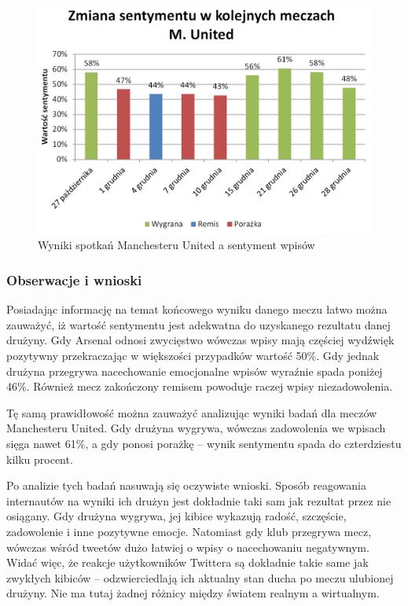 \begin{figure}[ht!]
\centering
\includegraphics[width=120mm]{img/pozytywnosc-munited2.png}
\caption{Wyniki spotkań Manchesteru United a sentyment wpisów}
\label{image:pozytywnosc-munited}
\end{figure}

\subsubsection{Obserwacje i wnioski}
Posiadając informację na temat końcowego wyniku danego meczu łatwo można 
zauważyć, iż wartość sentymentu jest adekwatna do uzyskanego rezultatu danej 
drużyny. Gdy Arsenal odnosi zwycięstwo wówczas wpisy mają częściej wydźwięk
pozytywny przekraczając w większości przypadków wartość 50\%. Gdy jednak 
drużyna przegrywa nacechowanie emocjonalne wpisów wyraźnie spada poniżej 46\%.
Również mecz zakończony remisem powoduje raczej wpisy niezadowolenia.
 
Tę samą prawidłowość można zauważyć analizując wyniki badań dla meczów
Manchesteru United. Gdy drużyna wygrywa, wówczas zadowolenia we wpisach sięga
nawet 61\%, a gdy ponosi porażkę -- wynik sentymentu spada do czterdziestu kilku
procent.

Po analizie tych badań nasuwają się oczywiste wnioski. Sposób reagowania
internautów na wyniki ich drużyn jest dokładnie taki sam jak rezultat przez nie
osiągany. Gdy drużyna wygrywa, jej kibice wykazują radość, szczęście,
zadowolenie i inne pozytywne emocje.
Natomiast gdy klub przegrywa mecz, wówczas wśród tweetów dużo łatwiej o wpisy o
nacechowaniu negatywnym. Widać więc, że reakcje użytkowników Twittera są
dokładnie takie same jak zwykłych kibiców -- odzwierciedlają ich aktualny stan
ducha po meczu ulubionej drużyny. Nie ma tutaj żadnej różnicy między światem
realnym a wirtualnym.















